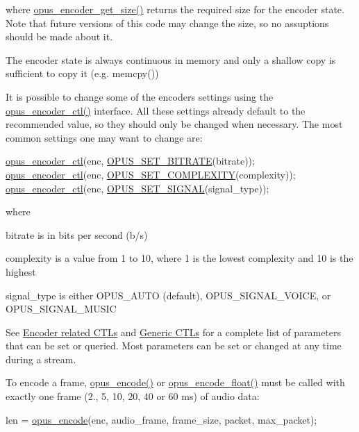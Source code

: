 where \hyperlink{group__opus__encoder_ga9ac72d062eca0c77711f5b04b9dcc645}{opus\+\_\+encoder\+\_\+get\+\_\+size()} returns the required size for the encoder state. Note that future versions of this code may change the size, so no assuptions should be made about it.

The encoder state is always continuous in memory and only a shallow copy is sufficient to copy it (e.\+g. memcpy())

It is possible to change some of the encoder\textquotesingle{}s settings using the \hyperlink{group__opus__encoder_ga88cb327d8f7d6a96c7d2d0b8461512e6}{opus\+\_\+encoder\+\_\+ctl()} interface. All these settings already default to the recommended value, so they should only be changed when necessary. The most common settings one may want to change are\+:


\begin{DoxyCode}
\hyperlink{group__opus__encoder_ga88cb327d8f7d6a96c7d2d0b8461512e6}{opus\_encoder\_ctl}(enc, \hyperlink{group__opus__encoderctls_ga0bb51947e355b33d0cb358463b5101a7}{OPUS\_SET\_BITRATE}(bitrate));
\hyperlink{group__opus__encoder_ga88cb327d8f7d6a96c7d2d0b8461512e6}{opus\_encoder\_ctl}(enc, \hyperlink{group__opus__encoderctls_ga3483877bf1687a75dd4a1de6f85f291c}{OPUS\_SET\_COMPLEXITY}(complexity));
\hyperlink{group__opus__encoder_ga88cb327d8f7d6a96c7d2d0b8461512e6}{opus\_encoder\_ctl}(enc, \hyperlink{group__opus__encoderctls_gaaa87ccee4ae46aa6c9528e03c5122b89}{OPUS\_SET\_SIGNAL}(signal\_type));
\end{DoxyCode}


where

\begin{DoxyItemize}
\item bitrate is in bits per second (b/s) \item complexity is a value from 1 to 10, where 1 is the lowest complexity and 10 is the highest \item signal\+\_\+type is either O\+P\+U\+S\+\_\+\+A\+U\+TO (default), O\+P\+U\+S\+\_\+\+S\+I\+G\+N\+A\+L\+\_\+\+V\+O\+I\+CE, or O\+P\+U\+S\+\_\+\+S\+I\+G\+N\+A\+L\+\_\+\+M\+U\+S\+IC\end{DoxyItemize}
See \hyperlink{group__opus__encoderctls}{Encoder related C\+T\+Ls} and \hyperlink{group__opus__genericctls}{Generic C\+T\+Ls} for a complete list of parameters that can be set or queried. Most parameters can be set or changed at any time during a stream.

To encode a frame, \hyperlink{group__opus__encoder_gabbb51305050b64614329637d6eff777c}{opus\+\_\+encode()} or \hyperlink{group__opus__encoder_ga4d7243152a1bc6bf4953d1d5c1e530c6}{opus\+\_\+encode\+\_\+float()} must be called with exactly one frame (2., 5, 10, 20, 40 or 60 ms) of audio data\+: 
\begin{DoxyCode}
len = \hyperlink{group__opus__encoder_gabbb51305050b64614329637d6eff777c}{opus\_encode}(enc, audio\_frame, frame\_size, packet, max\_packet);
\end{DoxyCode}


